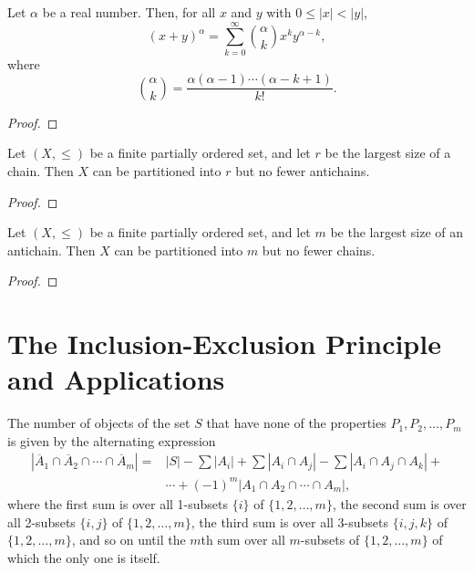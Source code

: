 \begin{theorem}
    \label{thm:5.5.1}
Let \( \alpha \) be a real number. Then, for all \( x \) and \( y \) with \( 0 \leq |x| < |y| \),
\[
(x + y)^\alpha = \sum_{k=0}^{\infty} \binom{\alpha}{k} x^k y^{\alpha-k},
\]
where
\[
\binom{\alpha}{k} = \frac{\alpha(\alpha - 1) \cdots (\alpha - k + 1)}{k!}.
\]
\end{theorem}
\begin{proof} 
\end{proof}

\begin{theorem}
    \label{thm:5.6.1}
Let \((X, \leq)\) be a finite partially ordered set, and let \( r \) be the largest size of a chain. Then \( X \) can be partitioned into \( r \) but no fewer antichains.
\end{theorem}
\begin{proof}   
\end{proof}

\begin{theorem}
    \label{thm:5.6.2}
Let \((X, \leq)\) be a finite partially ordered set, and let \(m\) be the largest size of an antichain. Then \(X\) can be partitioned into \(m\) but no fewer chains.
\end{theorem}
\begin{proof} 
\end{proof}


\chapter{The Inclusion-Exclusion Principle and Applications}

\begin{theorem}
    \label{thm:6.1.1}
The number of objects of the set $S$ that have none of the properties $P_1, P_2, \ldots, P_m$ is given by the alternating expression
\begin{align*}
    |\overline{A}_1 \cap \overline{A}_2 \cap \cdots \cap \overline{A}_m| 
    = & |S| - \sum |A_i| + \sum |A_i \cap A_j| - \sum |A_i \cap A_j \cap A_k| + \\ 
    & \cdots + (-1)^m |A_1 \cap A_2 \cap \cdots \cap A_m|, \tag{6.2}
\end{align*}
where the first sum is over all 1-subsets $\{i\}$ of $\{1,2,\ldots,m\}$, the second sum is over all 2-subsets $\{i,j\}$ of $\{1,2,\ldots,m\}$, the third sum is over all 3-subsets $\{i,j,k\}$ of $\{1,2,\ldots,m\}$, and so on until the $m$th sum over all $m$-subsets of $\{1,2,\ldots,m\}$ of which the only one is itself.
\end{theorem} 


